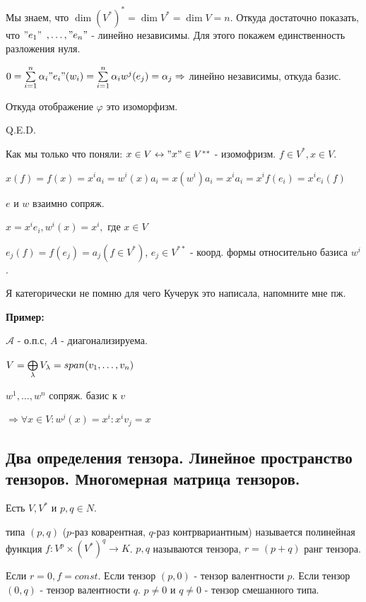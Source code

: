 Мы знаем, что $\dim (V^*)^* = \dim V^* = \dim V = n$. Откуда достаточно показать, что $"e_1"$ $,\ldots, "e_n"$ - линейно независимы. Для этого покажем единственность разложения нуля.

$0= \sum\limits_{i=1}^n \alpha_i "e_i"(w_i)=\sum\limits_{i=1}^n\alpha_i w^j(e_j) = \alpha_j \Rightarrow$ линейно независимы, откуда базис.

Откуда отображение $\varphi$ это изоморфизм.

\hfill Q.E.D.

Как мы только что поняли: $x \in V \leftrightarrow "x" \in V^{**}$ - изомофризм. $f\in V^{*}, x \in V$.

$x(f)= f(x) = x^i a_i = w^i(x) a_i = x(w^i)a_i =x^ia_i=x^i f(e_i)=x^ie_i(f)$

$e \text{ и }w$ взаимно сопряж.

$x=x^ie_i, w^i(x)=x^i,$ где $x \in V$

$e_j(f)=f(e_j)=a_j(f \in V^*)$, $e_j \in V^{**}$ - коорд. формы относительно базиса $w^i$.

Я категорически не помню для чего Кучерук это написала, напомните мне пж.





\textbf{Пример:}

$\mathcal{A}$ - о.п.с, $A$ - диагонализируема.

$V = \bigoplus\limits_{\lambda}V_{\lambda} = span (v_1,\ldots,v_n)$

$w^1,\ldots,w^n$ сопряж. базис к $v$  %

$\Rightarrow \forall x \in V: w^j(x) =x^i: x^iv_j = x$ 

\newpage
\subsection{Два определения тензора. Линейное пространство тензоров. Многомерная матрица тензоров.}

 Есть $V,V^*$ и $p,q \in N$.

 типа $(p,q)$ ($p$-раз коварентная, $q$-раз контрвариантным) называется полинейная функция $f: V^p\times (V^*)^q \rightarrow K$. $p,q$ называются  тензора, $r = (p+q)$ ранг тензора.

Если $r = 0, f = const$. Если тензор $(p,0) $ -  тензор валентности $p$. Если тензор $(0,q)$ -  тензор валентности $q$. $p\neq 0 $ и $q\neq 0$ - тензор смешанного типа.

